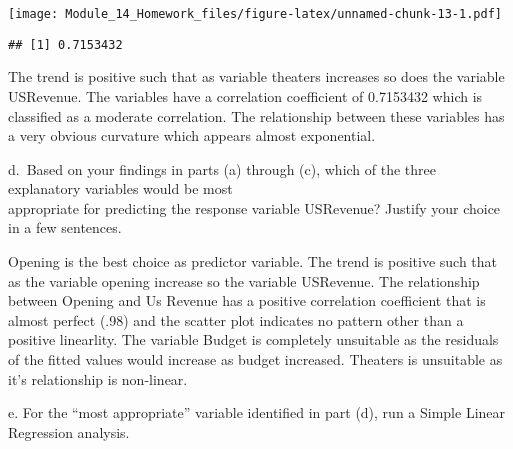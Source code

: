 \documentclass[
]{article}
\newenvironment{Shaded}{\begin{snugshade}}{\end{snugshade}}
\newcommand{\AttributeTok}[1]{\textcolor[rgb]{0.13,0.29,0.53}{#1}}
\newcommand{\FunctionTok}[1]{\textcolor[rgb]{0.13,0.29,0.53}{\textbf{#1}}}
\newcommand{\NormalTok}[1]{#1}
\newcommand{\SpecialCharTok}[1]{\textcolor[rgb]{0.81,0.36,0.00}{\textbf{#1}}}
\begin{document}
\begin{Shaded}
\end{Shaded}

\texttt{[image: Module\_14\_Homework\_files/figure-latex/unnamed-chunk-13-1.pdf]}

\begin{Shaded}
\end{Shaded}

\begin{verbatim}
## [1] 0.7153432
\end{verbatim}

The trend is positive such that as variable theaters increases so does
the variable USRevenue. The variables have a correlation coefficient of
0.7153432 which is classified as a moderate correlation. The
relationship between these variables has a very obvious curvature which
appears almost exponential.

\hfill\break
d.~Based on your findings in parts (a) through (c), which of the three
explanatory variables would be most\\
appropriate for predicting the response variable USRevenue? Justify your
choice in a few sentences.

Opening is the best choice as predictor variable. The trend is positive
such that as the variable opening increase so the variable USRevenue.
The relationship between Opening and Us Revenue has a positive
correlation coefficient that is almost perfect (.98) and the scatter
plot indicates no pattern other than a positive linearlity. The variable
Budget is completely unsuitable as the residuals of the fitted values
would increase as budget increased. Theaters is unsuitable as it's
relationship is non-linear.

\hfill\break
e. For the ``most appropriate'' variable identified in part (d), run a
Simple Linear Regression analysis.
\end{document}
